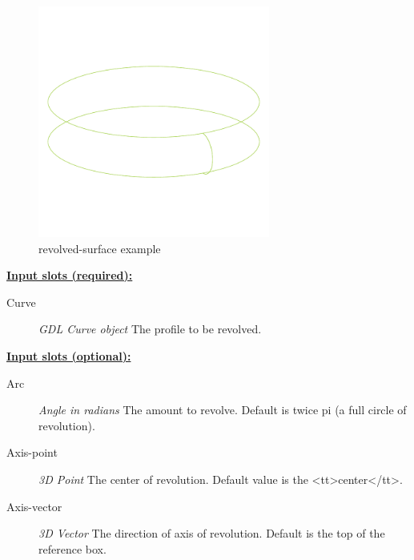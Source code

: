 \documentclass [11pt]{book}
\begin{document}
\begin{itemize}
\begin{figure}
\begin{center}
\includegraphics[width=3in,height=3in]{../images/example-revolved-surface.pdf}
\end{center}

\caption{revolved-surface example}

\label{fig:revolved-surface}

\end{figure}





\textbf{
\underline{Input slots (required):}}

\begin{description}

\item [Curve]
\emph{GDL Curve object} The profile to be revolved.


\end{description}






\textbf{
\underline{Input slots (optional):}}

\begin{description}

\item [Arc]
\emph{Angle in radians} The amount to revolve. Default is twice pi (a full circle of revolution).


\item [Axis-point]
\emph{3D Point} The center of revolution. Default value is the <tt>center</tt>.


\item [Axis-vector]
\emph{3D Vector} The direction of axis of revolution. Default is the top of the reference box.



\end{description}
\end{itemize}
\end{document}
